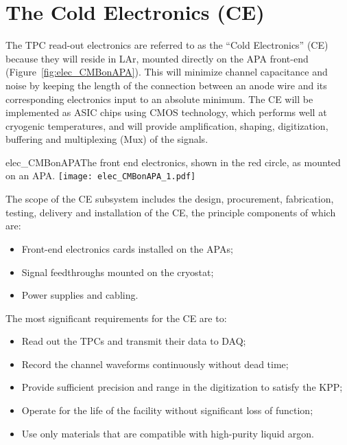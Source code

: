 \section{The Cold Electronics (CE)} 
\label{sec:detectors-fd-ref-ce}

The TPC read-out electronics are referred to as the ``Cold Electronics'' (CE) because they will reside in LAr,
mounted directly on the APA front-end (Figure~\ref{fig:elec_CMBonAPA}).
This will minimize channel capacitance and noise by keeping the length of the connection between an anode wire
and its corresponding electronics input to an absolute minimum.
The CE will be implemented as ASIC chips using CMOS technology,
which performs well at cryogenic temperatures,
and will provide amplification, shaping, digitization, buffering and multiplexing (Mux) of the signals.
\begin{cdrfigure}{elec_CMBonAPA}{The front end electronics,
shown in the red circle, as mounted on an APA.}
\texttt{[image: elec\_CMBonAPA\_1.pdf]}
\end{cdrfigure}

The scope of the CE subsystem includes the design, procurement, fabrication, testing,
delivery and installation of the CE, the principle components of which are:
\begin{itemize}
\item Front-end electronics cards installed on the APAs;
\item Signal feedthroughs mounted on the cryostat;
\item Power supplies and cabling.
\end{itemize}
The most significant requirements for the CE are to:
\begin{itemize}	
\item Read out the TPCs and transmit their data to DAQ;
\item Record the channel waveforms continuously without dead time;
\item Provide sufficient precision and range in the digitization to satisfy the KPP;
\item Operate for the life of the facility without significant loss of function;
\item Use only materials that are compatible with high-purity liquid argon.
\end{itemize}

